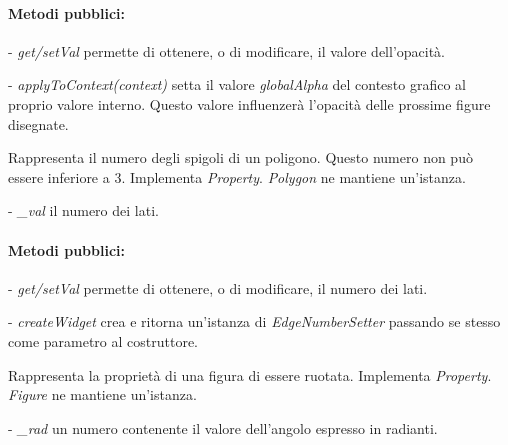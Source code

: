 \paragraph{Metodi pubblici:}
\begin{elencopuntato}[\subsubsecindent]
\item[-] \textit{get/setVal} permette di ottenere, o di modificare, il valore dell'opacit\`a.
\item[-] \textit{applyToContext(context)} setta il valore \textit{globalAlpha} del contesto grafico al proprio valore interno. Questo valore influenzer\`a l'opacit\`a delle prossime figure disegnate.
\end{elencopuntato}

Rappresenta il numero degli spigoli di un poligono. Questo numero non pu\`o essere inferiore a 3.
Implementa \textit{Property}.
\textit{Polygon} ne mantiene un'istanza.
\begin{elencopuntato}[\subsubsecindent]
\item[-] \textit{\_val} il numero dei lati.
\end{elencopuntato}
\paragraph{Metodi pubblici:}
\begin{elencopuntato}[\subsubsecindent]
\item[-] \textit{get/setVal} permette di ottenere, o di modificare, il numero dei lati.
\item[-] \textit{createWidget} crea e ritorna un'istanza di \textit{EdgeNumberSetter} passando se stesso come parametro al costruttore.
\end{elencopuntato}

Rappresenta la proprietà di una figura di essere ruotata.
Implementa \textit{Property}.
\textit{Figure} ne mantiene un'istanza.
\begin{elencopuntato}[\subsubsecindent]
\item[-] \textit{\_rad} un numero contenente il valore dell'angolo espresso in radianti.
\end{elencopuntato}
